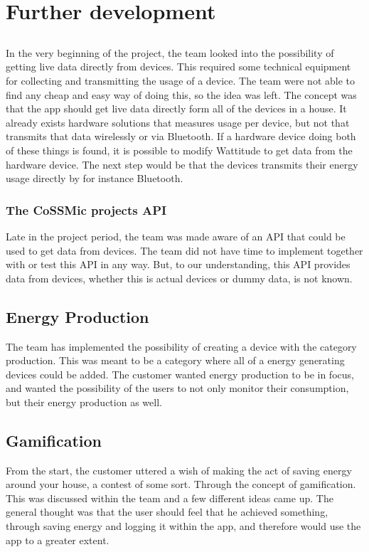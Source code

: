 \chapter{Further development}
\label{sec:further}
\section{}
In the very beginning of the project, the team looked into the possibility of getting live data directly from devices. This required some technical equipment for collecting and transmitting the usage of a device. The team were not able to find any cheap and easy way of doing this, so the idea was left. The concept was that the app should get live data directly form all of the devices in a house. It already exists hardware solutions that measures usage per device, but not that transmits that data wirelessly or via Bluetooth. If a hardware device doing both of these things is found, it is possible to modify Wattitude to get data from the hardware device. The next step would be that the devices transmits their energy usage directly by for instance Bluetooth. 

\subsection{The CoSSMic projects API}
Late in the project period, the team was made aware of an API that could be used to get data from devices. The team did not have time to implement together with or test this API in any way. But, to our understanding, this API provides data from devices, whether this is actual devices or dummy data, is not known. 

\section{Energy Production}
The team has implemented the possibility of creating a device with the category production. This was meant to be a category where all of a  energy generating devices could be added. The customer wanted energy production to be in focus, and wanted the possibility of the users to not only monitor their consumption, but their energy production as well. 

\section{Gamification}
From the start, the customer uttered a wish of making the act of saving energy around your house, a contest of some sort. Through the concept of gamification. This was discussed within the team and a few different ideas came up. The general thought was that the user should feel that he achieved something, through saving energy and logging it within the app, and therefore would use the app to a greater extent. 

